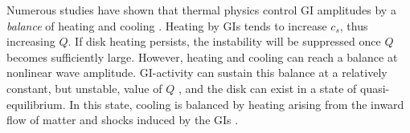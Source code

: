 \documentclass[manuscript]{aastex}
\begin{document}
Numerous studies have shown that thermal physics control GI amplitudes by a {\it balance} of heating and cooling \citep[e.g.,][]{tomley1991,tomley1994,pickett1998,pickett2000, pickett2003,gammie2001,boss2002,rice2003b,mejia2005,boley2006,boley2007, stamatellos2008,cossins2009}.
Heating by GIs tends to increase $c_s$, thus increasing $Q$. If disk heating persists, the instability will be suppressed once $Q$ becomes sufficiently large.  However, heating and cooling can reach a balance at nonlinear wave amplitude. GI-activity can sustain this balance  at a relatively constant,
but unstable, value of $Q$ \citep{paczynski1978, lin1981,goldreich1965}, and 
the disk can exist in a state of quasi-equilibrium. In this state, cooling is 
balanced by heating arising from the inward flow of matter and shocks induced by the GIs
\citep{gammie2001, lodato2004, rice2005, boley2006, cossins2009, vorobyov2010}.
\end{document}
